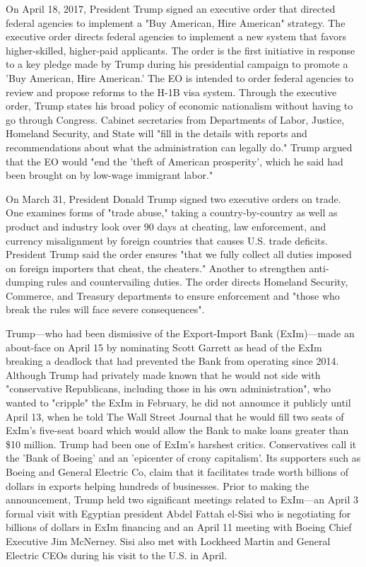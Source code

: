 On April 18, 2017, President Trump signed an executive order that
directed federal agencies to implement a "Buy American, Hire American"
strategy. The executive order directs federal agencies to implement a
new system that favors higher-skilled, higher-paid applicants. The order
is the first initiative in response to a key pledge made by Trump during
his presidential campaign to promote a 'Buy American, Hire American.'
The EO is intended to order federal agencies to review and propose
reforms to the H-1B visa system. Through the executive order, Trump
states his broad policy of economic nationalism without having to go
through Congress. Cabinet secretaries from Departments of Labor,
Justice, Homeland Security, and State will "fill in the details with
reports and recommendations about what the administration can legally
do." Trump argued that the EO would "end the 'theft of American
prosperity', which he said had been brought on by low-wage immigrant
labor."

On March 31, President Donald Trump signed two executive orders on
trade. One examines forms of "trade abuse," taking a country-by-country
as well as product and industry look over 90 days at cheating, law
enforcement, and currency misalignment by foreign countries that causes
U.S. trade deficits. President Trump said the order ensures "that we
fully collect all duties imposed on foreign importers that cheat, the
cheaters." Another to strengthen anti-dumping rules and countervailing
duties. The order directs Homeland Security, Commerce, and Treasury
departments to ensure enforcement and "those who break the rules will
face severe consequences".

Trump---who had been dismissive of the Export-Import Bank (ExIm)---made
an about-face on April 15 by nominating Scott Garrett as head of the
ExIm breaking a deadlock that had prevented the Bank from operating
since 2014. Although Trump had privately made known that he would not
side with "conservative Republicans, including those in his own
administration", who wanted to "cripple" the ExIm in February, he did
not announce it publicly until April 13, when he told The Wall Street
Journal that he would fill two seats of ExIm's five-seat board which
would allow the Bank to make loans greater than \$10 million. Trump had
been one of ExIm's harshest critics. Conservatives call it the 'Bank of
Boeing' and an 'epicenter of crony capitalism'. Its supporters such as
Boeing and General Electric Co, claim that it facilitates trade worth
billions of dollars in exports helping hundreds of businesses. Prior to
making the announcement, Trump held two significant meetings related to
ExIm---an April 3 formal visit with Egyptian president Abdel Fattah
el-Sisi who is negotiating for billions of dollars in ExIm financing and
an April 11 meeting with Boeing Chief Executive Jim McNerney. Sisi also
met with Lockheed Martin and General Electric CEOs during his visit to
the U.S. in April.

